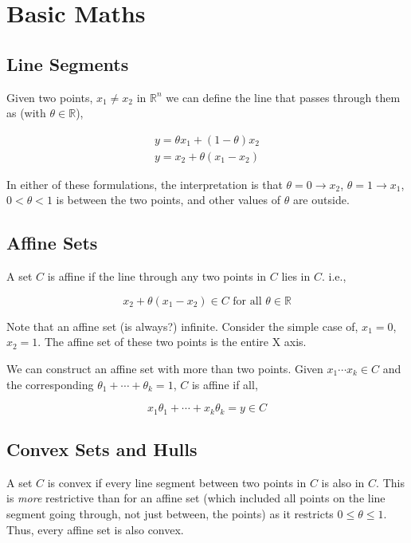 \documentclass{article}
\begin{document}
\section{Basic Maths}

\subsection{Line Segments}

Given two points, $x_1 \ne x_2$ in $\mathbb{R}^n$ we can define the line that passes through them as (with $\theta \in \mathbb{R}$),

\begin{align}
    y = \theta x_1 + (1 - \theta) x_2 \\
    y = x_2 + \theta ( x_1 - x_2)
\end{align}

\noindent
In either of these formulations, the interpretation is that
$\theta = 0 \rightarrow x_2$,
$\theta = 1 \rightarrow x_1$,
$0 < \theta < 1$ is between the two points,
and other values of $\theta$ are outside.

\subsection{Affine Sets}

A set $C$ is affine if the line through any two points in $C$ lies in $C$. i.e.,

\begin{equation}
    x_2 + \theta (x_1 - x_2 ) \in C \text{ for all } \theta \in \mathbb{R}
\end{equation}

Note that an affine set (is always?) infinite. Consider the simple case of, $x_1 = 0$, $x_2 = 1$. The affine set of these two points is the entire X axis.

We can construct an affine set with more than two points. Given $x_1 \cdots x_k \in C$ and the corresponding $\theta_1 + \cdots + \theta_k = 1$, $C$ is affine if all,

\begin{equation}
    x_1 \theta_1 + \cdots + x_k \theta_k = y \in C
\end{equation}

\subsection{Convex Sets and Hulls}

A set $C$ is convex if every line segment between two points in $C$ is also in $C$.
This is {\em more\/} restrictive than for an affine set (which included all points on the line segment going through, not just between, the points) as it restricts $0 \leq \theta \leq 1$.
Thus, every affine set is also convex.
\end{document}
